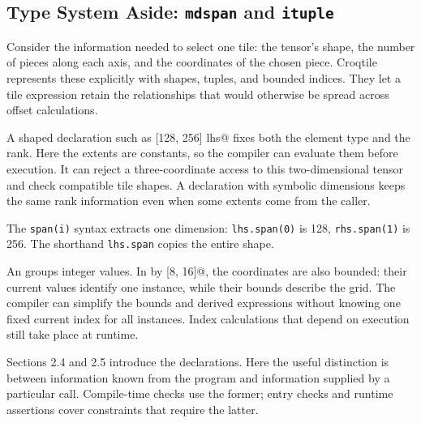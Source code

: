 \subsection*{Type System Aside: \texttt{mdspan} and \texttt{ituple}}

Consider the information needed to select one tile: the tensor's shape, the number of pieces along each axis, and the coordinates of the chosen piece. Croqtile represents these explicitly with shapes, tuples, and bounded indices. They let a tile expression retain the relationships that would otherwise be spread across offset calculations.

A shaped declaration such as  [128, 256] lhs@ fixes both the element type and the rank. Here the extents are constants, so the compiler can evaluate them before execution. It can reject a three-coordinate access to this two-dimensional tensor and check compatible tile shapes. A declaration with symbolic dimensions keeps the same rank information even when some extents come from the caller.

The \texttt{span(i)} syntax extracts one dimension: \texttt{lhs.span(0)} is 128, \texttt{rhs.span(1)} is 256. The shorthand \texttt{lhs.span} copies the entire shape.

An \co@ituple@ groups integer values. In  by [8, 16]@, the coordinates are also bounded: their current values identify one instance, while their bounds describe the grid. The compiler can simplify the bounds and derived expressions without knowing one fixed current index for all instances. Index calculations that depend on execution still take place at runtime.

Sections 2.4 and 2.5 introduce the declarations. Here the useful distinction is between information known from the program and information supplied by a particular call. Compile-time checks use the former; entry checks and runtime assertions cover constraints that require the latter.
